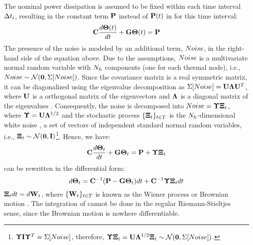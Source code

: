 The nominal power dissipation is assumed to be fixed within each time interval $\Delta t_i$, resulting in the constant term $\mathbf{P}$ instead of $\mathbf{P}(t)$ in  for this time interval:
\begin{equation} \equlabel{fourier-constant-power}
  \mcapacitance \frac{d\vtemperature(\time)}{d\time} + \mconductance \vtemperature(\time) = \vpower
\end{equation}
The presence of the noise is modeled by an additional term, $Noise$, in the right-hand side of the equation above. Due to the assumptions, $Noise$ is a multivariate normal random variable with $N_h$ components (one for each thermal node), i.e., $Noise \sim \mathcal{N}(\mathbf{0}, \Sigma[Noise])$. Since the covariance matrix is a real symmetric matrix, it can be diagonalized using the eigenvalue decomposition as $\Sigma[Noise] = \mathbf{U} \mathbf{\Lambda} \mathbf{U}^T$, where $\mathbf{U}$ is a orthogonal matrix of the eigenvectors and $\mathbf{\Lambda}$ is a diagonal matrix of the eigenvalues \cite{press2007}. Consequently, the noise is decomposed into $Noise = \mathbf{\Upsilon} \mathbf{\Xi}_t$, where $\mathbf{\Upsilon} = \mathbf{U} \mathbf{\Lambda}^{1/2}$ and the stochastic process $\{ \mathbf{\Xi}_t \}_{t \in T}$ is the $N_h$-dimensional white noise \cite{oksendal2003}, a set of vectors of independent standard normal random variables, i.e., $\mathbf{\Xi}_t \sim \mathcal{N}(\mathbf{0}, \mathbf{I})$\footnote{$\mathbf{\Upsilon} \mathbf{I} \mathbf{\Upsilon}^T = \Sigma[Noise]$, therefore, $\mathbf{\Upsilon} \mathbf{\Xi}_t = \mathbf{U} \mathbf{\Lambda}^{1/2} \mathbf{\Xi}_t \sim \mathcal{N}(\mathbf{0}, \Sigma[Noise])$.}. Hence, we have:
\begin{equation} \equlabel{fourier-noise}
  \mcapacitance \frac{d\vtemperature_\time}{d\time} + \mconductance \vtemperature_\time = \vpower + \mnoisedeviation \vnoise_\time
\end{equation}
 can be rewritten in the differential form:
\begin{equation} \equlabel{fourier-wiener}
  d\vtemperature_\time = \mcapacitance^{-1}(\vpower - \mconductance \vtemperature_\time)d\time + \mcapacitance^{-1} \mnoisedeviation \vnoise_t d\time
\end{equation}
$\mathbf{\Xi}_t dt = d\mathbf{W}_t$, where $\{ \mathbf{W}_t \}_{t \in T}$ is known as the Wiener process or Brownian motion \cite{oksendal2003}. The integration of  cannot be done in the regular Riemann-Stieltjes sense, since the Brownian motion is nowhere differentiable.

